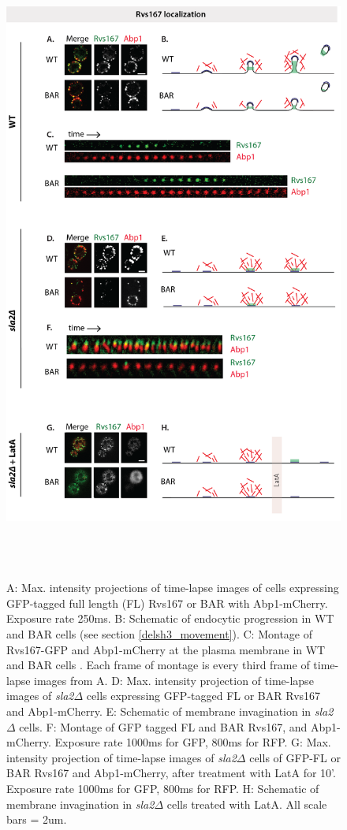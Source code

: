 	\begin{figure}
	\centering
	\includegraphics[width=21cm,height=21cm,keepaspectratio]{figures/results_final/sla2_del_final6}
	\caption [Localization of Rvs167 and BAR with and without membrane curvature]
	{A: Max. intensity projections of time-lapse images of cells expressing GFP-tagged full length (FL) Rvs167 or BAR with Abp1-mCherry. Exposure rate 250ms. B: Schematic of endocytic progression in WT and BAR cells (see section \ref{delsh3_movement}).
	C: Montage of Rvs167-GFP and Abp1-mCherry at the plasma membrane in WT and BAR cells . Each frame of montage is every third frame of time-lapse images from A. 
	D: Max. intensity projection of time-lapse images of \textit{sla2$\Delta$} cells expressing GFP-tagged FL or BAR Rvs167 and Abp1-mCherry. 
	E: Schematic of membrane invagination in \textit{sla2$\Delta$} cells. F: Montage of GFP tagged FL and BAR Rvs167, and Abp1-mCherry. Exposure rate 1000ms for GFP, 800ms for RFP. 
	G: Max. intensity projection of time-lapse images of \textit{sla2$\Delta$} cells of GFP-FL or BAR Rvs167 and Abp1-mCherry, after treatment with LatA for 10’. Exposure rate 1000ms for GFP, 800ms for RFP. H: Schematic of membrane invagination in \textit{sla2$\Delta$} cells treated with LatA. 
	All scale bars = 2um.
	\label{fig2_sla2del}}
	\end{figure}

